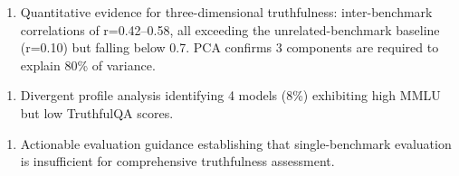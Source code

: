 \begin{enumerate}
\item Quantitative evidence for three-dimensional truthfulness: inter-benchmark correlations of r=0.42--0.58, all exceeding the unrelated-benchmark baseline (r=0.10) but falling below 0.7. PCA confirms 3 components are required to explain 80\% of variance.
\end{enumerate}

\begin{enumerate}
\item Divergent profile analysis identifying 4 models (8\%) exhibiting high MMLU but low TruthfulQA scores.
\end{enumerate}

\begin{enumerate}
\item Actionable evaluation guidance establishing that single-benchmark evaluation is insufficient for comprehensive truthfulness assessment.
\end{enumerate}

